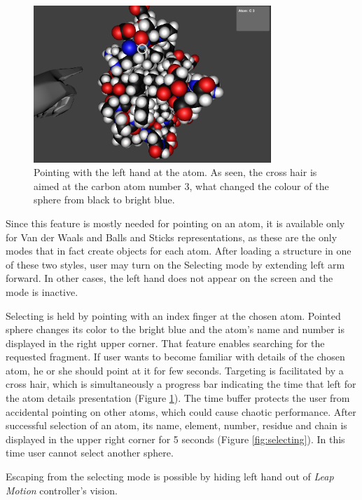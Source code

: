 \begin{figure}[!htb]
\centering    
\includegraphics[width=0.8\textwidth]{Figs/pointing.png}
\caption{Pointing with the left hand at the atom. As seen, the cross hair is aimed at the carbon atom number 3, what changed the colour of the sphere from black to bright blue.}
\label{fig:pointing} 
\end{figure}

Since this feature is mostly needed for pointing on an atom, it is available only for Van der Waals and Balls and Sticks representations, as these are the only modes that in fact create objects for each atom. After loading a structure in one of these two styles, user may turn on the Selecting mode by extending left arm forward. In other cases, the left hand does not appear on the screen and the mode is inactive.

Selecting is held by pointing with an index finger at the chosen atom. Pointed sphere changes its color to the bright blue and the atom's name and number is displayed in the right upper corner. That feature enables searching for the requested fragment. If user wants to become familiar with details of the chosen atom, he or she should point at it for few seconds. Targeting is facilitated by a cross hair, which is simultaneously a progress bar indicating the time that left for the atom details presentation (Figure \ref{fig:pointing}). The time buffer protects the user from accidental pointing on other atoms, which could cause chaotic performance.
After successful selection of an atom, its name, element, number, residue and chain is displayed in the upper right corner for 5 seconds (Figure \ref{fig:selecting}). In this time user cannot select another sphere. 

Escaping from the selecting mode is possible by hiding left hand out of \textit{Leap Motion} controller's vision. 

